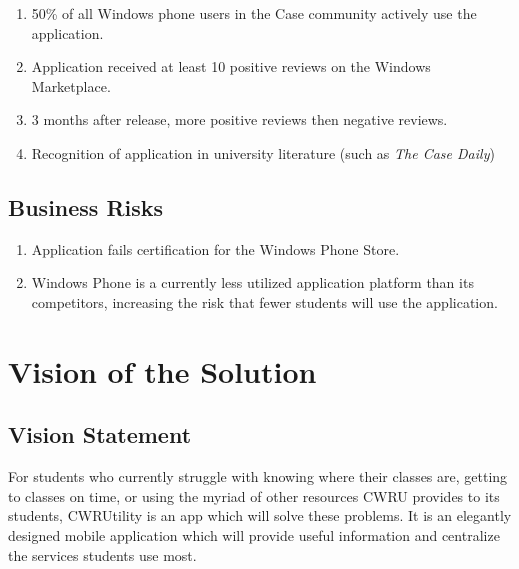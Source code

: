 \documentclass[pdftex,12pt,letter]{article}
\begin{document}
\begin{enumerate}[SC-1:]
\item 50\% of all Windows phone users in the Case community actively use the application.
\item Application received at least 10 positive reviews on the Windows Marketplace.
\item 3 months after release, more positive reviews then negative reviews.
\item Recognition of application in university literature (such as \emph{The Case Daily})
\end{enumerate}


\subsection{Business Risks}
\begin{enumerate}[BR-1:]
\item Application fails certification for the Windows Phone Store.
\item Windows Phone is a currently less utilized application platform than its competitors, increasing the risk that fewer students will use the application.
\end{enumerate}

\section{Vision of the Solution}
\subsection{Vision Statement}
For students who currently struggle with knowing where their classes are, getting to classes on time, or using the myriad of other resources CWRU provides to its students, CWRUtility is an app which will solve these problems. It is an elegantly designed mobile application which will provide useful information and centralize the services students use most.
\end{document}
